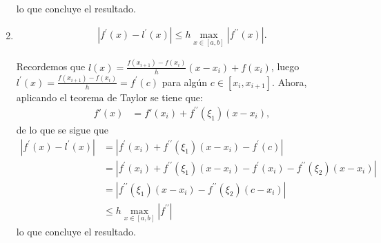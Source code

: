 \begin{homeworkProblem}
\begin{enumerate}
\begin{solucion}
\begin{align*}
        \end{align*}
        lo que concluye el resultado.
      \end{solucion}
    \item \begin{align*}
      |f^{\prime}(x)-l^{\prime}(x)|\leq h\max_{x\in[a,b]}|f^{\prime\prime}(x)|.
    \end{align*}
      \begin{solucion}
        Recordemos que $l(x)=\frac{f(x_{i+1})-f(x_i)}{h}(x-x_{i})+f(x_i)$, luego  $l^{\prime}(x)=\frac{f(x_{i+1})-f(x_i)}{h}=f^{\prime}(c)$ para algún $c\in [x_{i},x_{i+1}]$. Ahora, aplicando el teorema de Taylor se tiene que:
        \begin{align*}
          f'(x)&=f'(x_i)+f^{\prime\prime}(\xi_1)(x-x_{i}),
        \end{align*}
        de lo que se sigue que
        \begin{align*}
          |f^{\prime}(x)-l^{\prime}(x)|&=|f^{\prime}(x_i)+f^{\prime\prime}(\xi_1)(x-x_i)-f^{\prime}(c)|\\
          &=|f^{\prime}(x_i)+f^{\prime\prime}(\xi_1)(x-x_i)-f^{\prime}(x_i)-f^{\prime\prime}(\xi_2)(x-x_i)|\\
          &=|f^{\prime\prime}(\xi_1)(x-x_i)-f^{\prime\prime}(\xi_2)(c-x_i)|\\
          &\leq h\max_{x\in[a,b]}|f^{\prime\prime}|
        \end{align*}
        lo que concluye el resultado.
      \end{solucion}
  \end{enumerate}
\end{homeworkProblem}
